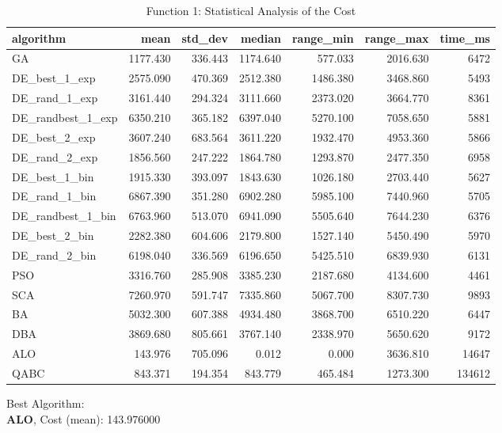 \documentclass[12pt]{article}
\begin{document}
\begin{table}[H]
    \centering
    \footnotesize
    \begin{adjustbox}{width=1\textwidth}
\begin{tabular}{lrrrrrr}
\toprule
         algorithm &     mean &  std\_dev &   median &  range\_min &  range\_max &  time\_ms \\
\midrule
                GA & 1177.430 &  336.443 & 1174.640 &    577.033 &   2016.630 &     6472 \\
     DE\_best\_1\_exp & 2575.090 &  470.369 & 2512.380 &   1486.380 &   3468.860 &     5493 \\
     DE\_rand\_1\_exp & 3161.440 &  294.324 & 3111.660 &   2373.020 &   3664.770 &     8361 \\
 DE\_randbest\_1\_exp & 6350.210 &  365.182 & 6397.040 &   5270.100 &   7058.650 &     5881 \\
     DE\_best\_2\_exp & 3607.240 &  683.564 & 3611.220 &   1932.470 &   4953.360 &     5866 \\
     DE\_rand\_2\_exp & 1856.560 &  247.222 & 1864.780 &   1293.870 &   2477.350 &     6958 \\
     DE\_best\_1\_bin & 1915.330 &  393.097 & 1843.630 &   1026.180 &   2703.440 &     5627 \\
     DE\_rand\_1\_bin & 6867.390 &  351.280 & 6902.280 &   5985.100 &   7440.960 &     5705 \\
 DE\_randbest\_1\_bin & 6763.960 &  513.070 & 6941.090 &   5505.640 &   7644.230 &     6376 \\
     DE\_best\_2\_bin & 2282.380 &  604.606 & 2179.800 &   1527.140 &   5450.490 &     5970 \\
     DE\_rand\_2\_bin & 6198.040 &  336.569 & 6196.650 &   5425.510 &   6839.930 &     6131 \\
               PSO & 3316.760 &  285.908 & 3385.230 &   2187.680 &   4134.600 &     4461 \\
               SCA & 7260.970 &  591.747 & 7335.860 &   5067.700 &   8307.730 &     9893 \\
                BA & 5032.300 &  607.388 & 4934.480 &   3868.700 &   6510.220 &     6447 \\
               DBA & 3869.680 &  805.661 & 3767.140 &   2338.970 &   5650.620 &     9172 \\
               ALO &  143.976 &  705.096 &    0.012 &      0.000 &   3636.810 &    14647 \\
              QABC &  843.371 &  194.354 &  843.779 &    465.484 &   1273.300 &   134612 \\
\bottomrule
\end{tabular}


    \end{adjustbox}
    \caption{Function 1: Statistical Analysis of the Cost} 
    \end{table}
Best Algorithm: \\
\textbf{ALO}, Cost (mean): 143.976000\\
\newpage
\end{document}
